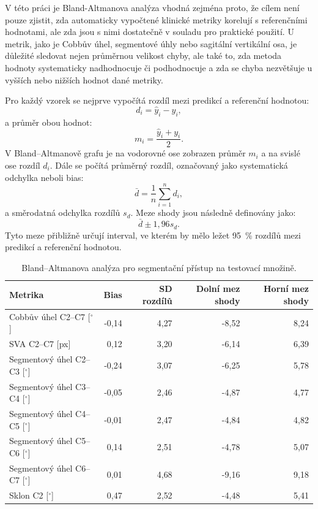 \documentclass[male,czech,api_bc]{kitheses}
\begin{document}
V této práci je Bland-Altmanova analýza vhodná zejména proto, že cílem není pouze zjistit, zda automaticky vypočtené klinické metriky korelují s referenčními hodnotami, ale zda jsou s nimi dostatečně v souladu pro praktické použití. U metrik, jako je Cobbův úhel, segmentové úhly nebo sagitální vertikální osa, je důležité sledovat nejen průměrnou velikost chyby, ale také to, zda metoda hodnoty systematicky nadhodnocuje či podhodnocuje a zda se chyba nezvětšuje u vyšších nebo nižších hodnot dané metriky.

Pro každý vzorek se nejprve vypočítá rozdíl mezi predikcí a referenční hodnotou:
\[
d_i = \hat{y}_i - y_i,
\]
a průměr obou hodnot:
\[
m_i = \frac{\hat{y}_i + y_i}{2}.
\]
V Bland--Altmanově grafu je na vodorovné ose zobrazen průměr $m_i$ a na svislé ose rozdíl $d_i$. Dále se počítá průměrný rozdíl, označovaný jako systematická odchylka neboli bias:
\[
\bar{d} = \frac{1}{n}\sum_{i=1}^{n} d_i,
\]
a směrodatná odchylka rozdílů $s_d$. Meze shody jsou následně definovány jako:
\[
\bar{d} \pm 1{,}96s_d.
\]
Tyto meze přibližně určují interval, ve kterém by mělo ležet 95~\% rozdílů mezi predikcí a referenční hodnotou.

\begin{table}[H]
\centering
\caption{Bland--Altmanova analýza pro segmentační přístup na testovací množině.}
\label{tab:ba_seg_test}
\begin{tabular}{lrrrr}
\toprule
\textbf{Metrika} & \textbf{Bias} & \textbf{SD rozdílů} & \textbf{Dolní mez shody} & \textbf{Horní mez shody} \\
\midrule
Cobbův úhel C2--C7 [$^\circ$] & -0{,}14 & 4{,}27 & -8{,}52 & 8{,}24 \\
SVA C2--C7 [px] & 0{,}12 & 3{,}20 & -6{,}14 & 6{,}39 \\
Segmentový úhel C2--C3 [$^\circ$] & -0{,}24 & 3{,}07 & -6{,}25 & 5{,}78 \\
Segmentový úhel C3--C4 [$^\circ$] & -0{,}05 & 2{,}46 & -4{,}87 & 4{,}77 \\
Segmentový úhel C4--C5 [$^\circ$] & -0{,}01 & 2{,}47 & -4{,}84 & 4{,}82 \\
Segmentový úhel C5--C6 [$^\circ$] & 0{,}14 & 2{,}51 & -4{,}78 & 5{,}07 \\
Segmentový úhel C6--C7 [$^\circ$] & 0{,}01 & 4{,}68 & -9{,}16 & 9{,}18 \\
Sklon C2 [$^\circ$] & 0{,}47 & 2{,}52 & -4{,}48 & 5{,}41 \\
\bottomrule
\end{tabular}
\end{table}
\end{document}

